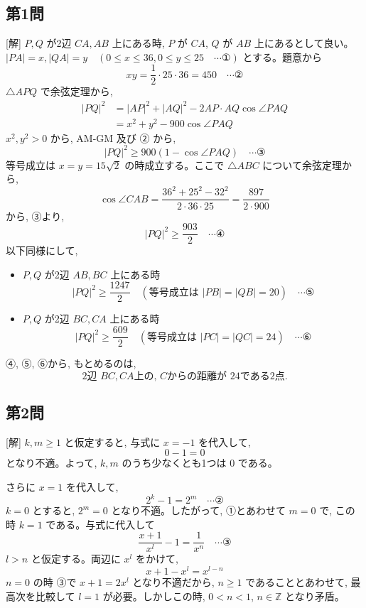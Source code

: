 \documentclass[../main.tex]{subfiles}
\begin{document}
\subsection*{第1問}

[解] $P, Q$ が2辺 $CA, AB$ 上にある時, $P$ が $CA$, $Q$ が $AB$ 上にあるとして良い。
$|PA|=x, |QA|=y \quad (0 \le x \le 36, 0 \le y \le 25 \quad \cdots \text{①})$ とする。題意から
\[
  xy = \frac{1}{2} \cdot 25 \cdot 36 = 450 \quad \cdots \text{②}
\]
$\triangle APQ$ で余弦定理から,
\[
  \begin{aligned}
    |PQ|^2 &= |AP|^2 + |AQ|^2 - 2 AP \cdot AQ \cos \angle PAQ \\
    &= x^2 + y^2 - 900 \cos \angle PAQ
  \end{aligned}
\]
$x^2, y^2 > 0$ から, AM-GM 及び ② から,
\[
  |PQ|^2 \ge 900 (1 - \cos \angle PAQ) \quad \cdots \text{③}
\]
等号成立は $x=y=15\sqrt{2}$ の時成立する。ここで $\triangle ABC$ について余弦定理から,
\[
  \cos \angle CAB = \frac{36^2 + 25^2 - 32^2}{2 \cdot 36 \cdot 25} = \frac{897}{2 \cdot 900}
\]
から, ③より,
\[
  |PQ|^2 \ge \frac{903}{2} \quad \cdots \text{④}
\]
以下同様にして,
\begin{itemize}
  \item $P, Q$ が2辺 $AB, BC$ 上にある時
    \[
      |PQ|^2 \ge \frac{1247}{2} \quad (\text{等号成立は } |PB|=|QB|=20) \quad \cdots \text{⑤}
    \]
  \item $P, Q$ が2辺 $BC, CA$ 上にある時
    \[
      |PQ|^2 \ge \frac{609}{2} \quad (\text{等号成立は } |PC|=|QC|=24) \quad \cdots \text{⑥}
    \]
\end{itemize}
④, ⑤, ⑥から, もとめるのは,
\[
  \text{2辺 } BC, CA \text{上の, } C \text{からの距離が } 24 \text{である2点.}
\]

\subsection*{第2問}

[解] $k, m \ge 1$ と仮定すると, 与式に $x=-1$ を代入して,
\[
  0 - 1 = 0
\]
となり不適。よって, $k, m$ のうち少なくとも1つは $0$ である。 \quad \cdots {}

さらに $x=1$ を代入して,
\[
  2^k - 1 = 2^m \quad \cdots \text{②}
\]
$k=0$ とすると, $2^m = 0$ となり不適。したがって, ①とあわせて $m=0$ で, この時 $k=1$ である。与式に代入して
\[
  \frac{x+1}{x^l} - 1 = \frac{1}{x^n} \quad \cdots \text{③}
\]
$l > n$ と仮定する。両辺に $x^l$ をかけて,
\[
  x + 1 - x^l = x^{l-n}
\]
$n=0$ の時 ③で $x+1 = 2x^l$ となり不適だから, $n \ge 1$ であることとあわせて, 最高次を比較して $l=1$ が必要。しかしこの時, $0 < n < 1$, $n \in \mathbb{Z}$ となり矛盾。
\end{document}
